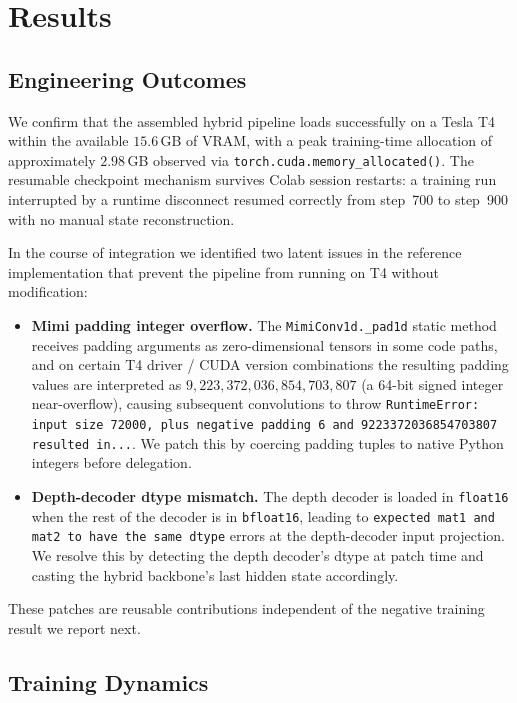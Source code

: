 \documentclass[conference]{IEEEtran}
\begin{document}
\section{Results}
\label{sec:results}

\subsection{Engineering Outcomes}

We confirm that the assembled hybrid pipeline loads successfully on a Tesla T4 within the available $15.6$\,GB of VRAM, with a peak training-time allocation of approximately $2.98$\,GB observed via \texttt{torch.cuda.memory\_allocated()}. The resumable checkpoint mechanism survives Colab session restarts: a training run interrupted by a runtime disconnect resumed correctly from step~700 to step~900 with no manual state reconstruction.

In the course of integration we identified two latent issues in the reference implementation that prevent the pipeline from running on T4 without modification:

\begin{itemize}
    \item \textbf{Mimi padding integer overflow.} The \texttt{MimiConv1d.\_pad1d} static method receives padding arguments as zero-dimensional tensors in some code paths, and on certain T4 driver / CUDA version combinations the resulting padding values are interpreted as $9{,}223{,}372{,}036{,}854{,}703{,}807$ (a 64-bit signed integer near-overflow), causing subsequent convolutions to throw \texttt{RuntimeError: input size 72000, plus negative padding 6 and 9223372036854703807 resulted in...}. We patch this by coercing padding tuples to native Python integers before delegation.
    \item \textbf{Depth-decoder dtype mismatch.} The depth decoder is loaded in \texttt{float16} when the rest of the decoder is in \texttt{bfloat16}, leading to \texttt{expected mat1 and mat2 to have the same dtype} errors at the depth-decoder input projection. We resolve this by detecting the depth decoder's dtype at patch time and casting the hybrid backbone's last hidden state accordingly.
\end{itemize}

These patches are reusable contributions independent of the negative training result we report next.

\subsection{Training Dynamics}
\end{document}

